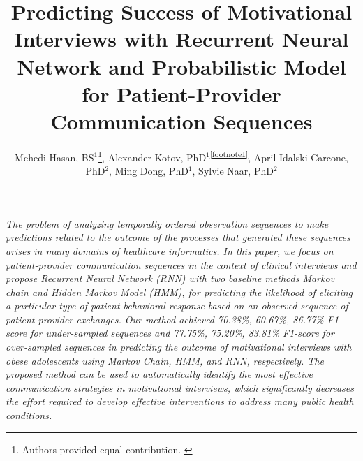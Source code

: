 \documentclass{amia_summit_2018}
\begin{document}
\title{Predicting Success of Motivational Interviews with Recurrent Neural Network and Probabilistic Model for Patient-Provider Communication Sequences}

\author{Mehedi Hasan, BS$^{1}$\footnote[1]{Authors provided equal contribution. \label{footnote1}}, Alexander Kotov, PhD$^{1}$\textsuperscript{\ref{footnote1}}, April Idalski Carcone, PhD$^{2}$, Ming Dong, PhD$^{1}$, Sylvie Naar, PhD$^{2}$}


\maketitle

\textit{The problem of analyzing temporally ordered observation sequences to make predictions related to the outcome of the processes that generated these sequences arises in many domains of healthcare informatics. In this paper, we focus on patient-provider communication sequences in the context of clinical interviews and propose Recurrent Neural Network (RNN) with two baseline methods Markov chain and Hidden Markov Model (HMM), for predicting the likelihood of eliciting a particular type of patient behavioral response based on an observed sequence of patient-provider exchanges. Our method achieved 70.38\%, 60.67\%, 86.77\% F1-score for under-sampled sequences and 77.75\%, 75.20\%, 83.81\% F1-score for over-sampled sequences in predicting the outcome of motivational interviews with obese adolescents using Markov Chain, HMM, and RNN, respectively. The proposed method can be used to automatically identify the most effective communication strategies in motivational interviews, which significantly decreases the effort required to develop effective interventions to address many public health conditions.}
\end{document}
